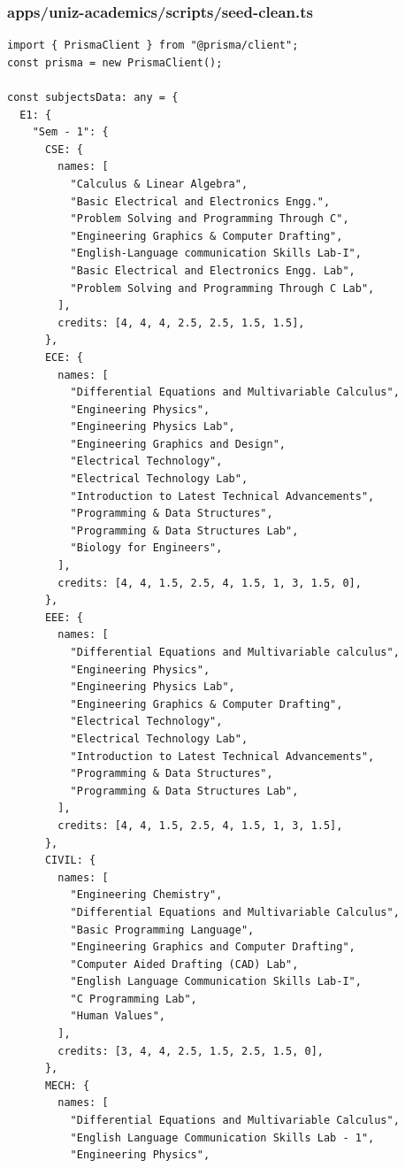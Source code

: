 \documentclass[11pt,a4paper,oneside]{article}
\begin{document}
\subsubsection*{apps/uniz-academics/scripts/seed-clean.ts}
\begin{lstlisting}
import { PrismaClient } from "@prisma/client";
const prisma = new PrismaClient();

const subjectsData: any = {
  E1: {
    "Sem - 1": {
      CSE: {
        names: [
          "Calculus & Linear Algebra",
          "Basic Electrical and Electronics Engg.",
          "Problem Solving and Programming Through C",
          "Engineering Graphics & Computer Drafting",
          "English-Language communication Skills Lab-I",
          "Basic Electrical and Electronics Engg. Lab",
          "Problem Solving and Programming Through C Lab",
        ],
        credits: [4, 4, 4, 2.5, 2.5, 1.5, 1.5],
      },
      ECE: {
        names: [
          "Differential Equations and Multivariable Calculus",
          "Engineering Physics",
          "Engineering Physics Lab",
          "Engineering Graphics and Design",
          "Electrical Technology",
          "Electrical Technology Lab",
          "Introduction to Latest Technical Advancements",
          "Programming & Data Structures",
          "Programming & Data Structures Lab",
          "Biology for Engineers",
        ],
        credits: [4, 4, 1.5, 2.5, 4, 1.5, 1, 3, 1.5, 0],
      },
      EEE: {
        names: [
          "Differential Equations and Multivariable calculus",
          "Engineering Physics",
          "Engineering Physics Lab",
          "Engineering Graphics & Computer Drafting",
          "Electrical Technology",
          "Electrical Technology Lab",
          "Introduction to Latest Technical Advancements",
          "Programming & Data Structures",
          "Programming & Data Structures Lab",
        ],
        credits: [4, 4, 1.5, 2.5, 4, 1.5, 1, 3, 1.5],
      },
      CIVIL: {
        names: [
          "Engineering Chemistry",
          "Differential Equations and Multivariable Calculus",
          "Basic Programming Language",
          "Engineering Graphics and Computer Drafting",
          "Computer Aided Drafting (CAD) Lab",
          "English Language Communication Skills Lab-I",
          "C Programming Lab",
          "Human Values",
        ],
        credits: [3, 4, 4, 2.5, 1.5, 2.5, 1.5, 0],
      },
      MECH: {
        names: [
          "Differential Equations and Multivariable Calculus",
          "English Language Communication Skills Lab - 1",
          "Engineering Physics",

\end{lstlisting}
\end{document}
